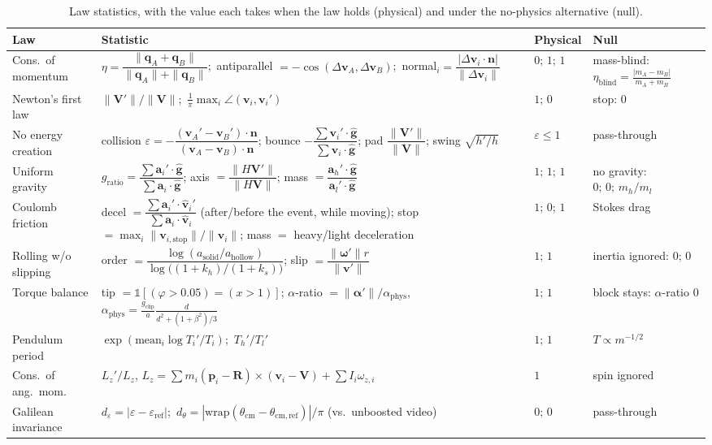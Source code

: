 \documentclass[10pt]{article}
\newcommand{\eps}{\varepsilon}
\newcommand{\ind}{\mathbb{1}}
\newcommand{\ghat}{\hat{\mathbf g}}
\begin{document}
\begin{table}[h]
\centering\small
\renewcommand{\arraystretch}{1.35}
\begin{tabularx}{\linewidth}{@{}l>{\raggedright\arraybackslash}X>{\raggedright\arraybackslash}p{1.7cm}>{\raggedright\arraybackslash}p{3.0cm}@{}}
\toprule
Law & Statistic & Physical & Null \\
\midrule
Cons.\ of momentum & $\eta=\dfrac{\|\mathbf q_A+\mathbf q_B\|}{\|\mathbf q_A\|+\|\mathbf q_B\|}$;\
antiparallel $=-\cos(\Delta\mathbf v_A,\Delta\mathbf v_B)$;\ normal$_i=\dfrac{|\Delta\mathbf v_i\cdot\mathbf n|}{\|\Delta\mathbf v_i\|}$
& $0;\,1;\,1$ & mass-blind: $\eta_{\mathrm{blind}}=\frac{|m_A-m_B|}{m_A+m_B}$ \\
Newton's first law & $\|\mathbf V'\|/\|\mathbf V\|$;\ $\frac1\pi\max_i\angle(\mathbf v_i,\mathbf v_i')$ & $1;\,0$ & stop: $0$ \\
No energy creation & collision $\eps=-\dfrac{(\mathbf v_A'-\mathbf v_B')\cdot\mathbf n}{(\mathbf v_A-\mathbf v_B)\cdot\mathbf n}$;
bounce $-\dfrac{\sum\mathbf v_i'\cdot\ghat}{\sum\mathbf v_i\cdot\ghat}$; pad $\dfrac{\|\mathbf V'\|}{\|\mathbf V\|}$;
swing $\sqrt{h'/h}$ & $\eps\le1$ & pass-through \\
Uniform gravity & $g_{\mathrm{ratio}}=\dfrac{\sum\mathbf a_i'\cdot\ghat}{\sum\mathbf a_i\cdot\ghat}$;
axis $=\dfrac{\|H\mathbf V'\|}{\|H\mathbf V\|}$; mass $=\dfrac{\mathbf a_h'\cdot\ghat}{\mathbf a_l'\cdot\ghat}$ & $1;\,1;\,1$ & no gravity: $0;\,0;\,m_h/m_l$ \\
Coulomb friction & decel $=\dfrac{\sum\mathbf a_i'\cdot\hat{\mathbf v}_i'}{\sum\mathbf a_i\cdot\hat{\mathbf v}_i}$ (after/before the event, while moving);
stop $=\max_i\|\mathbf v_{i,\mathrm{stop}}\|/\|\mathbf v_i\|$; mass $=$ heavy/light deceleration & $1;\,0;\,1$ & Stokes drag \\
Rolling w/o slipping & order $=\dfrac{\log(a_{\mathrm{solid}}/a_{\mathrm{hollow}})}{\log\big((1+k_h)/(1+k_s)\big)}$;
slip $=\dfrac{\|\boldsymbol\omega'\|r}{\|\mathbf v'\|}$ & $1;\,1$ & inertia ignored: $0;\,0$ \\
Torque balance & tip $=\ind[(\varphi>0.05)=(x>1)]$; $\alpha$-ratio $=\|\boldsymbol\alpha'\|/\alpha_{\mathrm{phys}}$,
$\alpha_{\mathrm{phys}}=\frac{g_{\mathrm{clip}}}{a}\frac{d}{d^2+(1+\beta^2)/3}$ & $1;\,1$ & block stays: $\alpha$-ratio $0$ \\
Pendulum period & $\exp(\mathrm{mean}_i\log T_i'/T_i)$;\ $T_h'/T_l'$ & $1;\,1$ & $T\propto m^{-1/2}$ \\
Cons.\ of ang.\ mom. & $L_z'/L_z$, $L_z=\sum m_i(\mathbf p_i-\mathbf R)\times(\mathbf v_i-\mathbf V)+\sum I_i\omega_{z,i}$ & $1$ & spin ignored \\
Galilean invariance & $d_\eps=|\eps-\eps_{\mathrm{ref}}|$;\ $d_\theta=|\mathrm{wrap}(\theta_{\mathrm{cm}}-\theta_{\mathrm{cm,ref}})|/\pi$ (vs.\ unboosted video) & $0;\,0$ & pass-through \\
\bottomrule
\end{tabularx}
\caption{Law statistics, with the value each takes when the law holds (physical) and under the no-physics alternative (null).}
\label{tab:laws}
\end{table}
\end{document}
